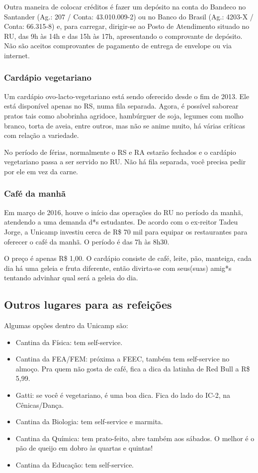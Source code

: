 Outra maneira de colocar créditos é fazer um depósito na conta do Bandeco no
Santander (Ag.: 207 / Conta: 43.010.009-2) ou no Banco do Brasil (Ag.: 4203-X /
Conta: 66.315-8) e, para carregar, dirigir-se ao Posto de Atendimento situado
no RU, das 9h às 14h e das 15h às 17h, apresentando o comprovante de depósito.
Não são aceitos comprovantes de pagamento de entrega de envelope ou via
internet.

\subsubsection{Cardápio vegetariano}

Um cardápio ovo-lacto-vegetariano está sendo oferecido desde o fim de 2013. Ele
está disponível apenas no RS, numa fila separada. Agora, é possível saborear
pratos tais como abobrinha agridoce, hambúrguer de soja, legumes com molho
branco, torta de aveia, entre outros, mas não se anime muito, há várias
críticas com relação a variedade.

No período de férias, normalmente o RS e RA estarão fechados e o cardápio
vegetariano passa a ser servido no RU. Não há fila separada, você precisa pedir
por ele em vez da carne.

\subsubsection{Café da manhã}

Em março de 2016, houve o início das operações do RU no período da manhã,
atendendo a uma demanda d*s estudantes. De acordo com o ex-reitor Tadeu Jorge,
a Unicamp investiu cerca de R\$ 70 mil para equipar os restaurantes para
oferecer o café da manhã. O período é das 7h às 8h30.

O preço é apenas R\$ 1,00. O cardápio consiste de café, leite, pão, manteiga,
cada dia há uma geleia e fruta diferente, então divirta-se com seus(suas)
amig*s tentando advinhar qual será a geleia do dia.

\subsection{Outros lugares para as refeições}

Algumas opções dentro da Unicamp são:

\begin{itemize}
\item Cantina da Física: tem self-service.
\item Cantina da FEA/FEM: próxima a FEEC, também tem self-service no almoço.
  Pra quem não gosta de café, fica a dica da latinha de Red Bull a R\$ 5,99.
\item Gatti: se você é vegetariano, é uma boa dica. Fica do lado do IC-2, na
  Cênicas/Dança.
\item Cantina da Biologia: tem self-service e marmita.
\item Cantina da Química: tem prato-feito, abre também aos sábados. O melhor é
  o pão de queijo em dobro às quartas e quintas!
\item Cantina da Educação: tem self-service.
\end {itemize}

